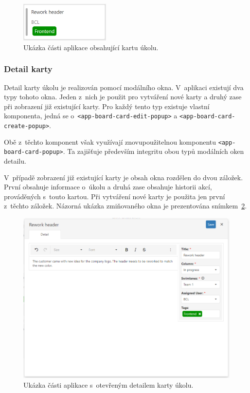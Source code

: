 \begin{figure}[H]
	\centering
	\label{img:card}
	\includegraphics[width=0.4\textwidth]{obrazky-figures/card.png}
	\caption{Ukázka části aplikace obsahující kartu úkolu.}
\end{figure}

\subsubsection*{Detail karty}
Detail karty úkolu je realizován pomocí modálního okna. V~aplikaci existují dva typy tohoto okna. Jeden z~nich je použit pro vytváření nové karty a druhý zase při zobrazení již existující karty. Pro každý tento typ existuje vlastní komponenta, jedná se o~\texttt{<app-board-card-edit-popup>} a \texttt{<app-board-card-create-popup>}.

Obě z~těchto komponent však využívají znovupoužitelnou komponentu \texttt{<app-board-card-popup>}. Ta zajišťuje především integritu obou typů modálních oken detailu.

V~případě zobrazení již existující karty je obsah okna rozdělen do dvou záložek. První obsahuje informace o~úkolu a druhá zase obsahuje historii akcí, prováděných s~touto kartou. Při vytváření nové karty je použita jen první z~těchto záložek. Názorná ukázka zmiňovaného okna je prezentována snímkem~\ref{img:card-detail}.

\begin{figure}[H]
	\centering
	\label{img:card-detail}
	\includegraphics[width=\textwidth]{obrazky-figures/card-detail.png}
	\caption{Ukázka části aplikace s~otevřeným detailem karty úkolu.}
\end{figure}


